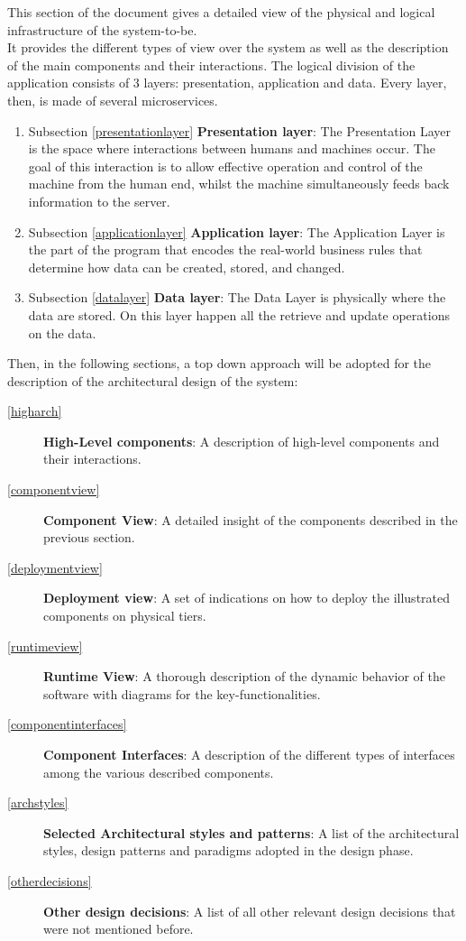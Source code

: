 This section of the document gives a detailed view of the physical and logical infrastructure of the system-to-be. 
\\It provides the different types of view over the system as well as the description of the main components and their interactions.
The logical division of the application consists of 3 layers: presentation, application and data.
Every layer, then, is made of several microservices.
\begin{enumerate}
	\item Subsection \ref{presentationlayer} \textbf{Presentation layer}: The Presentation Layer is the space where interactions between humans and machines occur. The goal of this interaction is to allow effective operation and control of the machine from the human end, whilst the machine simultaneously feeds back information to the server.
	\item Subsection \ref{applicationlayer} \textbf{Application layer}: The Application Layer is the part of the program that encodes the real-world business rules that determine how data can be created, stored, and changed.
	\item Subsection \ref{datalayer} \textbf{Data layer}: The Data Layer is physically where the data are stored. On this layer happen all the retrieve and update operations on the data. 
\end{enumerate}

Then, in the following sections, a top down approach will be adopted for the description of the architectural design of the system:
\begin{description}
	\item[\ref{higharch}] \textbf{High-Level components}: A description of high-level components and their interactions.
	\item[\ref{componentview}] \textbf{Component View}: A detailed insight of the components described in the previous section.
	\item[\ref{deploymentview}] \textbf{Deployment view}: A set of indications on how to deploy the illustrated components on physical tiers.
	\item[\ref{runtimeview}] \textbf{Runtime View}: A thorough description of the dynamic behavior of the software with diagrams for the key-functionalities.
	\item[\ref{componentinterfaces}] \textbf{Component Interfaces}: A description of the different types of interfaces among the various described components.
	\item[\ref{archstyles}] \textbf{Selected Architectural styles and patterns}: A list of the architectural styles, design patterns and paradigms adopted in the design phase.
	\item[\ref{otherdecisions}] \textbf{Other design decisions}: A list of all other relevant design decisions that were not mentioned before.
\end{description}
